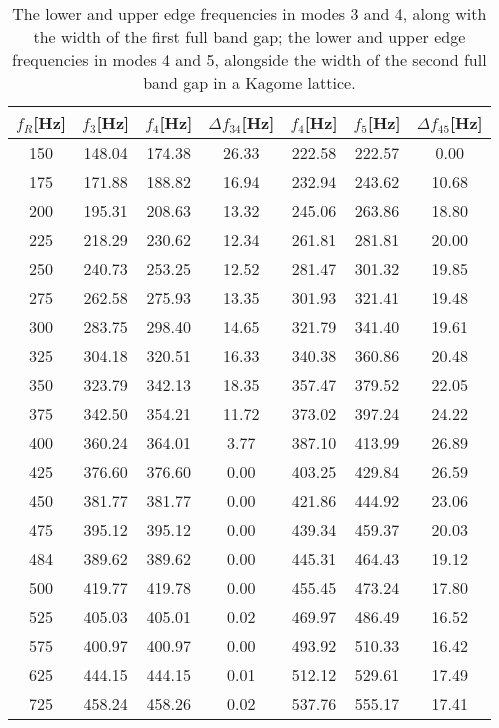 \documentclass{article}
\begin{document}
\begin{table}[htb]
\centering
\caption{The lower and upper edge frequencies in modes 3 and 4, along with the width of the first full band gap; the lower and upper edge frequencies in modes 4 and 5, alongside the width of the second full band gap in a Kagome lattice.}
\label{tab500}
\begin{tabular}{ccccccc}
\hline
$f_R$[Hz] & $f_3$[Hz] & $f_4$[Hz] & $\Delta f_{34}$[Hz] & $f_4$[Hz] & $f_5$[Hz] & $\Delta f_{45}$[Hz] \\ \hline
150 & 148.04 & 174.38 & 26.33 & 222.58 & 222.57 & 0.00 \\ \hline
175 & 171.88 & 188.82 & 16.94 & 232.94 & 243.62 & 10.68 \\ \hline
200 & 195.31 & 208.63 & 13.32 & 245.06 & 263.86 & 18.80 \\ \hline
225 & 218.29 & 230.62 & 12.34 & 261.81 & 281.81 & 20.00 \\ \hline
250 & 240.73 & 253.25 & 12.52 & 281.47 & 301.32 & 19.85 \\ \hline
275 & 262.58 & 275.93 & 13.35 & 301.93 & 321.41 & 19.48 \\ \hline
300 & 283.75 & 298.40 & 14.65 & 321.79 & 341.40 & 19.61 \\ \hline
325 & 304.18 & 320.51 & 16.33 & 340.38 & 360.86 & 20.48 \\ \hline
350 & 323.79 & 342.13 & 18.35 & 357.47 & 379.52 & 22.05 \\ \hline
375 & 342.50 & 354.21 & 11.72 & 373.02 & 397.24 & 24.22 \\ \hline
400 & 360.24 & 364.01 & 3.77 & 387.10 & 413.99 & 26.89 \\ \hline
425 & 376.60 & 376.60 & 0.00 & 403.25 & 429.84 & 26.59 \\ \hline
450 & 381.77 & 381.77 & 0.00 & 421.86 & 444.92 & 23.06 \\ \hline
475 & 395.12 & 395.12 & 0.00 & 439.34 & 459.37 & 20.03 \\ \hline
484 & 389.62 & 389.62 & 0.00 & 445.31 & 464.43 & 19.12 \\ \hline
500 & 419.77 & 419.78 & 0.00 & 455.45 & 473.24 & 17.80 \\ \hline
525 & 405.03 & 405.01 & 0.02 & 469.97 & 486.49 & 16.52 \\ \hline
575 & 400.97 & 400.97 & 0.00 & 493.92 & 510.33 & 16.42 \\ \hline
625 & 444.15 & 444.15 & 0.01 & 512.12 & 529.61 & 17.49 \\ \hline
725 & 458.24 & 458.26 & 0.02 & 537.76 & 555.17 & 17.41 \\ \hline
\end{tabular}
\end{table}
\end{document}

